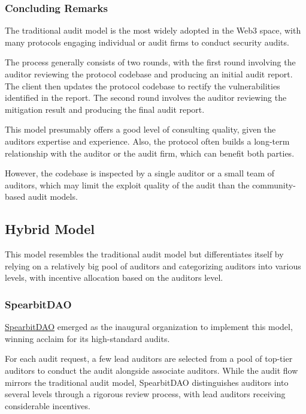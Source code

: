 \documentclass[10pt]{extarticle}
\begin{document}
\subsubsection{ Concluding Remarks}\label{313-concluding-remarks}

The traditional audit model is the most widely adopted in the Web3
space, with many protocols engaging individual or audit firms to conduct
security audits.

The process generally consists of two rounds, with the first round
involving the auditor reviewing the protocol codebase and producing an
initial audit report. The client then updates the protocol codebase to
rectify the vulnerabilities identified in the report. The second round
involves the auditor reviewing the mitigation result and producing the
final audit report.

This model presumably offers a good level of consulting quality, given
the auditor\textquotesingle s expertise and experience. Also, the
protocol often builds a long-term relationship with the auditor or the
audit firm, which can benefit both parties.

However, the codebase is inspected by a single auditor or a small team
of auditors, which may limit the exploit quality of the audit than the
community-based audit models.

\subsection{ Hybrid Model}\label{32-hybrid-model}

This model resembles the traditional audit model but differentiates
itself by relying on a relatively big pool of auditors and categorizing
auditors into various levels, with incentive allocation based on the
auditor\textquotesingle s level.

\subsubsection{ SpearbitDAO}\label{321-spearbitdao}

\href{https://spearbit.com/}{SpearbitDAO} emerged as the inaugural
organization to implement this model, winning acclaim for its
high-standard audits.

For each audit request, a few lead auditors are selected from a pool of
top-tier auditors to conduct the audit alongside associate auditors.
While the audit flow mirrors the traditional audit model, SpearbitDAO
distinguishes auditors into several levels through a rigorous review
process, with lead auditors receiving considerable incentives.
\end{document}
